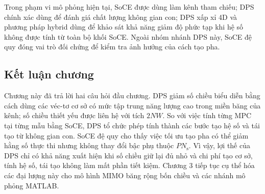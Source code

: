 Trong phạm vi mô phỏng hiện tại, SoCE được dùng làm kênh tham chiếu; DPS chính xác dùng để đánh giá chất lượng không gian con; DPS xấp xỉ 4D và phương pháp hybrid dùng để khảo sát khả năng giảm độ phức tạp khi hệ số không được tính từ toàn bộ khối SoCE. Ngoài nhóm nhánh DPS này, SoCE đệ quy đóng vai trò đối chứng để kiểm tra ảnh hưởng của cách tạo pha.

\subsection{Kết luận chương}
\label{subsec:ch2_conclusion}

Chương này đã trả lời hai câu hỏi đầu chương. DPS giảm số chiều biểu diễn bằng cách dùng các véc-tơ cơ sở có mức tập trung năng lượng cao trong miền băng của kênh; số chiều thiết yếu được liên hệ với tích \(2NW\). So với việc tính từng MPC tại từng mẫu bằng SoCE, DPS tổ chức phép tính thành các bước tạo hệ số và tái tạo từ không gian con. SoCE đệ quy cho thấy việc tối ưu tạo pha có thể giảm hằng số thực thi nhưng không thay đổi bậc phụ thuộc \(PN_{\mathrm{s}}\). Vì vậy, lợi thế của DPS chỉ có khả năng xuất hiện khi số chiều giữ lại đủ nhỏ và chi phí tạo cơ sở, tính hệ số, tái tạo không làm mất phần tiết kiệm. Chương 3 tiếp tục cụ thể hóa các đại lượng này cho mô hình MIMO băng rộng bốn chiều và các nhánh mô phỏng MATLAB.

\cleardoublepage

